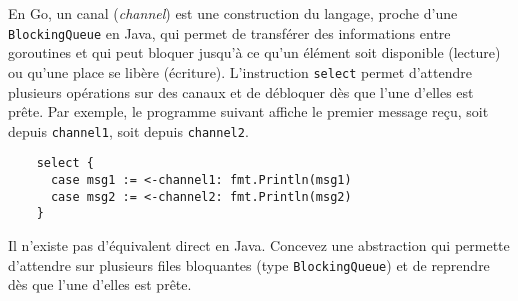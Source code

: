 
\begingroup

\begin{exercice}
  \label{exo:monitors/go}

  En Go, un canal (\emph{channel}) est une construction du langage, proche d'une \texttt{BlockingQueue} en Java, 
  qui permet de transférer des informations entre goroutines et qui peut bloquer jusqu'à ce qu'un élément soit disponible 
  (lecture) ou qu'une place se libère (écriture). L'instruction \texttt{select} permet d'attendre plusieurs opérations 
  sur des canaux et de débloquer dès que l'une d'elles est prête. Par exemple, le programme suivant affiche le premier 
  message reçu, soit depuis \texttt{channel1}, soit depuis \texttt{channel2}.
 
  \begin{lstlisting}
    select {
      case msg1 := <-channel1: fmt.Println(msg1)
      case msg2 := <-channel2: fmt.Println(msg2)
    }
  \end{lstlisting}

  \begin{question}
  \item Il n'existe pas d'équivalent direct en Java. Concevez une abstraction qui permette d'attendre
    sur plusieurs files bloquantes (type \texttt{BlockingQueue})
    et de reprendre dès que l'une d'elles est prête.
  \end{question}

\end{exercice}

\endgroup
\endinput

